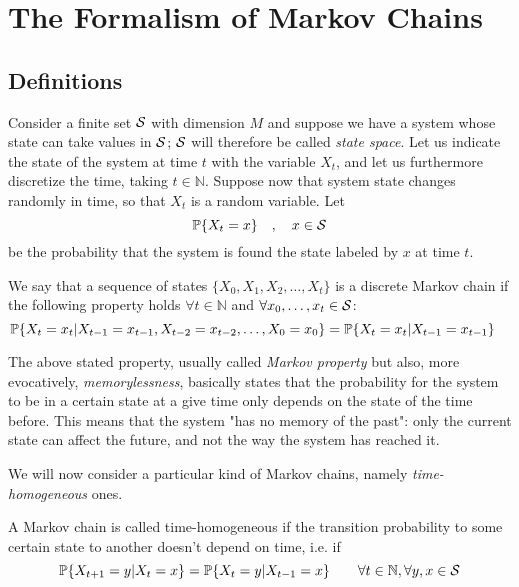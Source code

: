 \chapter{The Formalism of Markov Chains}
\label{ch:markov_chains}
\section{Definitions}
Consider a finite set $\mathcal{S}$ with dimension $M$ and suppose we have a system whose state can take values in $\mathcal{S}$; $\mathcal{S}$ will therefore be called \emph{state space}. Let us indicate the state of the system at time $t$ with the variable $X_t$, and let us furthermore discretize the time, taking $t \in \mathbb{N}$. Suppose now that system state changes randomly in time, so that $X_t$ is a random variable. Let
\begin{equation}
    \mathbb{P}\{X_t = x\} \quad , \quad x \in \mathcal{S}
\end{equation}
be the probability that the system is found the state labeled by $x$ at time $t$.
\begin{ndef}  We say that a sequence of states $\{X_0, X_1, X_2, \dots, X_t\}$ is a discrete Markov chain if the following property holds $\forall t \in \mathbb N$ and $\forall x_0, \dots, x_t \in \mathcal{S}$:
    \begin{equation}
        \mathbb{P}\{ X_t = x_t | X_{t-1} = x_{t-1}, X_{t-2} = x_{t-2}, \dots, X_0 = x_0 \} = \mathbb{P}\{ X_t = x_t | X_{t-1} = x_{t-1} \} \quad 
    \end{equation}
\end{ndef}
The above stated property, usually called \emph{Markov property} but also, more evocatively, \emph{memorylessness}, basically states that the probability for the system to be in a certain state at a give time only depends on the state of the time before. This means that the system "has no memory of the past": only the current state can affect the future, and not the way the system has reached it.

\smallskip
We will now consider a particular kind of Markov chains, namely \emph{time-homogeneous} ones.
\begin{ndef}  A Markov chain is called time-homogeneous if the transition probability to some certain state to another doesn't depend on time, i.e. if
    \begin{equation}
        \mathbb{P}\{X_{t+1} = y | X_{t} = x\} = \mathbb{P}\{X_{t} = y | X_{t-1} = x\} \quad \quad \forall t\in \mathbb{N}, \forall y, x \in \mathcal{S}
    \end{equation}
\end{ndef}

